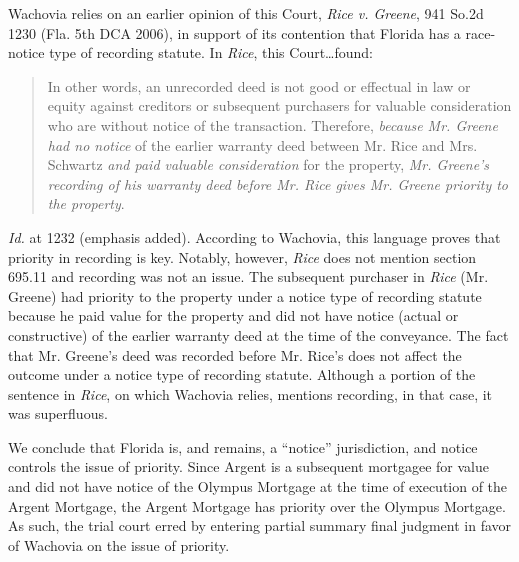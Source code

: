 Wachovia relies on an earlier opinion of this Court, \textit{Rice v.
Greene}, 941 So.2d 1230 (Fla. 5th DCA 2006), in support of its contention that
Florida has a race-notice type of recording statute.
In \textit{Rice}, this Court\dots found:
\begin{quote}
In other words, an unrecorded deed is not good or effectual in law or equity
against creditors or subsequent purchasers for valuable consideration who are
without notice of the transaction. Therefore, \textit{because Mr. Greene had no
notice} of the earlier warranty deed between Mr. Rice and Mrs.
Schwartz \textit{and paid valuable consideration} for the property, \textit{Mr.
Greene's recording of his warranty deed before Mr. Rice gives Mr. Greene
priority to the property}.
\end{quote}
\textit{Id.} at 1232 (emphasis added). According to Wachovia, this
language proves that priority in recording is key. Notably,
however, \textit{Rice} does not mention section 695.11 and recording was not an
issue. The subsequent purchaser in \textit{Rice} (Mr. Greene) had priority to
the property under a notice type of recording statute because he paid value for
the property and did not have notice (actual or constructive) of the earlier
warranty deed at the time of the conveyance. The fact that Mr. Greene's deed
was recorded before Mr. Rice's does not affect the outcome under a notice type
of recording statute. Although a portion of the sentence
in \textit{Rice}, on which Wachovia relies, mentions recording, in that
case, it was superfluous.

We conclude that Florida is, and remains, a ``notice'' jurisdiction, and notice
controls the issue of priority. Since Argent is a subsequent mortgagee for
value and did not have notice of the Olympus Mortgage at the time of execution
of the Argent Mortgage, the Argent Mortgage has priority over the Olympus
Mortgage. As such, the trial court erred by entering partial summary final
judgment in favor of Wachovia on the issue of priority.

